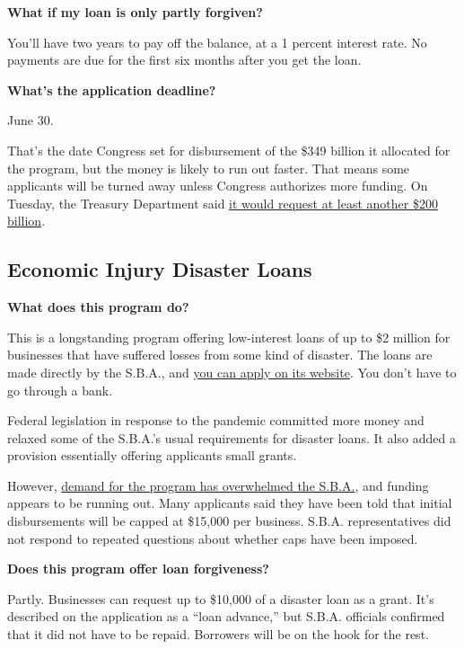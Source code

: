 \textbf{What if my loan is only partly forgiven?}

You'll have two years to pay off the balance, at a 1 percent interest
rate. No payments are due for the first six months after you get the
loan.

\textbf{What's the application deadline?}

June 30.

That's the date Congress set for disbursement of the \$349 billion it
allocated for the program, but the money is likely to run out faster.
That means some applicants will be turned away unless Congress
authorizes more funding. On Tuesday, the Treasury Department said
\href{https://www.nytimes.com/2020/04/07/business/stock-market-today-coronavirus.html\#link-4be214b5}{it
would request at least another \$200 billion}.

\hypertarget{economic-injury-disaster-loans}{%
\subsection{Economic Injury Disaster
Loans}\label{economic-injury-disaster-loans}}

\textbf{What does this program do?}

This is a longstanding program offering low-interest loans of up to \$2
million for businesses that have suffered losses from some kind of
disaster. The loans are made directly by the S.B.A., and
\href{https://covid19relief.sba.gov/\#/}{you can apply on its website}.
You don't have to go through a bank.

Federal legislation in response to the pandemic committed more money and
relaxed some of the S.B.A.'s usual requirements for disaster loans. It
also added a provision essentially offering applicants small grants.

However,
\href{https://www.nytimes.com/2020/04/09/business/smallbusiness/small-business-disaster-loans-coronavirus.html}{demand
for the program has overwhelmed the S.B.A.}, and funding appears to be
running out. Many applicants said they have been told that initial
disbursements will be capped at \$15,000 per business. S.B.A.
representatives did not respond to repeated questions about whether caps
have been imposed.

\textbf{Does this program offer loan forgiveness?}

Partly. Businesses can request up to \$10,000 of a disaster loan as a
grant. It's described on the application as a ``loan advance,'' but
S.B.A. officials confirmed that it did not have to be repaid. Borrowers
will be on the hook for the rest.


